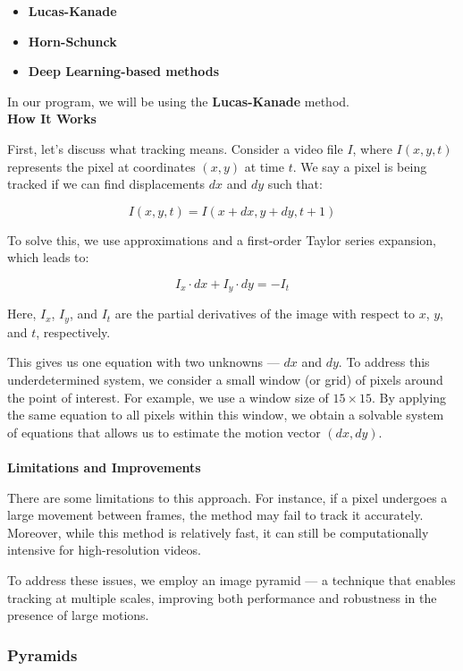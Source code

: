 \documentclass[a4paper,12pt]{article}
\begin{document}
\begin{itemize}
    \item \textbf{Lucas-Kanade}
    \item \textbf{Horn-Schunck}
    \item \textbf{Deep Learning-based methods}
\end{itemize}

In our program, we will be using the \textbf{Lucas-Kanade} method. \\
\textbf{How It Works}

First, let's discuss what tracking means. Consider a video file \( I \), where \( I(x, y, t) \) represents the pixel at coordinates \( (x, y) \) at time \( t \).  
We say a pixel is being tracked if we can find displacements \( dx \) and \( dy \) such that:

\[
I(x, y, t) = I(x + dx, y + dy, t + 1)
\]

To solve this, we use approximations and a first-order Taylor series expansion, which leads to:

\[
I_x \cdot dx + I_y \cdot dy = -I_t
\]

Here, \( I_x \), \( I_y \), and \( I_t \) are the partial derivatives of the image with respect to \( x \), \( y \), and \( t \), respectively.

This gives us one equation with two unknowns — \( dx \) and \( dy \). To address this underdetermined system, we consider a small window (or grid) of pixels around the point of interest. For example, we use a window size of \( 15 \times 15 \).  
By applying the same equation to all pixels within this window, we obtain a solvable system of equations that allows us to estimate the motion vector \((dx, dy)\).\\ \\
\textbf{Limitations and Improvements}

There are some limitations to this approach. For instance, if a pixel undergoes a large movement between frames, the method may fail to track it accurately. Moreover, while this method is relatively fast, it can still be computationally intensive for high-resolution videos.

To address these issues, we employ an image pyramid — a technique that enables tracking at multiple scales, improving both performance and robustness in the presence of large motions.

\subsubsection{Pyramids}
\end{document}
